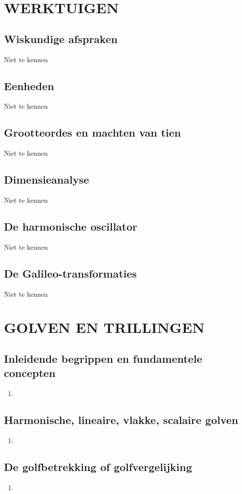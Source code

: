 \documentclass[12pt]{article}
\begin{document}
    \section{WERKTUIGEN}
    \subsection{Wiskundige afspraken}
    Niet te kennen
    \subsection{Eenheden}
    Niet te kennen
    \subsection{Grootteordes en machten van tien}
    Niet te kennen
    \subsection{Dimensieanalyse}
    Niet te kennen
    \subsection{De harmonische oscillator}
    Niet te kennen
    \subsection{De Galileo-transformaties}
    Niet te kennen



    \section{GOLVEN EN TRILLINGEN}
    \subsection{Inleidende begrippen en fundamentele concepten}
    \begin{enumerate}
        \item 
    \end{enumerate}
    \subsection{Harmonische, lineaire, vlakke, scalaire golven}
    \begin{enumerate}
        \item 
    \end{enumerate}
    \subsection{De golfbetrekking of golfvergelijking}
    \begin{enumerate}
        \item 
    \end{enumerate}
\end{document}
